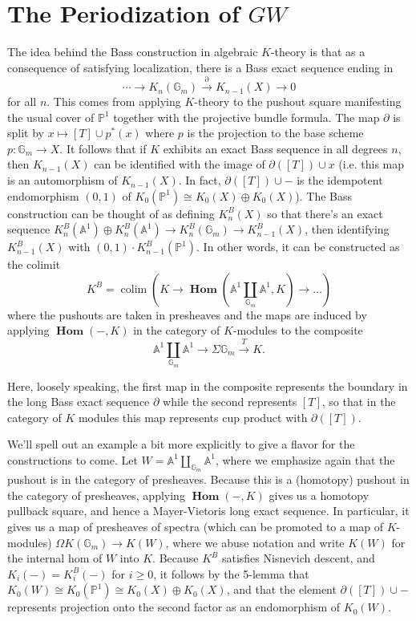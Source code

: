 \documentclass[edeposit,fullpage]{uiucthesis2009}
\newcommand{\mbb}{\mathbb}
\DeclareMathOperator*{\colim}{colim}
\DeclareMathOperator{\iHom}{\mathbf{Hom}}
\theoremstyle{plain}
\numberwithin{lemma}{section}
\theoremstyle{definition}
\begin{document}
\section{The Periodization of $GW$}

The idea behind the Bass construction in algebraic $K$-theory is that
as a consequence of satisfying localization, there is a
Bass exact sequence ending in
\[
\cdots \rightarrow K_n(\mbb G_m) \xrightarrow{\partial} K_{n-1}(X) \rightarrow 0
\]
for all $n$. This comes from applying $K$-theory to the pushout square manifesting
the usual cover of $\mbb P^1$ together with the projective bundle formula. The map $\partial$ is split by $x
\mapsto [T] \cup p^*(x)$ where $p$ is the projection to the base scheme $p : \mbb G_m
\rightarrow X$. It follows that if $K$ exhibits an exact Bass sequence
in all degrees $n$, then $K_{n-1}(X)$ can be identified with
the image of $\partial([T]) \cup x$ (i.e. this map is an automorphism
of $K_{n-1}(X)$. In fact, $\partial([T]) \cup -$ is the idempotent endomorphism
$(0,1)$ of $K_{0}(\mbb P^1) \cong K_0(X) \oplus K_0(X)$).
 The Bass construction can be thought of as defining
$K^B_n(X)$ so that there's an exact sequence $K^B_n(\mbb A^1) \oplus
K^B_n(\mbb A^1) \rightarrow K^B_n(\mbb G_m) \rightarrow K^B_{n-1}(X)$,
then identifying $K^B_{n-1}(X)$ with $(0,1) \cdot
K^B_{n-1}(\mbb P^1)$. In other words, it can be constructed as the colimit
\[
K^B = \colim(K \rightarrow \iHom(\mbb A^1 \coprod_{\mbb G_m} \mbb
A^1,K) \rightarrow \dots)
\] 
where the pushouts are taken in presheaves and the maps are induced by applying $\iHom(-,K)$ in the category of
$K$-modules to the composite
\[
\mbb A^1 \coprod_{\mbb G_m} \mbb A^1 \rightarrow \Sigma \mbb G_m
\xrightarrow{T} K.
\]

Here, loosely speaking, the first map in the composite represents the
boundary in the long Bass exact sequence $\partial$
while the second represents $[T]$, so that in the category of $K$
modules this map represents cup product with $\partial([T])$. 

We'll spell out an example a bit more explicitly to give a flavor for the
constructions to come. Let $W = \mbb A^1 \coprod_{\mbb G_m} \mbb A^1$,
where we emphasize again that the pushout is in the category of
presheaves. Because this is a (homotopy) pushout in the category of
presheaves, applying $\iHom(-,K)$ gives us a homotopy pullback square,
and hence a Mayer-Vietoris long exact sequence. In particular, it gives us a map
of presheaves of spectra (which can be promoted to a map of $K$-modules) $\Omega  K(\mbb G_m) \rightarrow K(W)$, where
we abuse notation and write $K(W)$ for the internal hom of $W$ into
$K$. Because $K^B$ satisfies Nisnevich descent, and $K_i(-) =
K^B_i(-)$ for $i \geq 0$, it follows by the 5-lemma that $K_0(W) \cong
K_0(\mbb P^1) \cong K_0(X) \oplus K_0(X)$, and that the element
$\partial([T]) \cup -$ represents projection onto the second factor as an
endomorphism of $K_0(W)$. 
\end{document}

